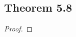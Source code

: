 \documentclass[../../main.tex]{subfiles}
\begin{document}
\subsection{Theorem 5.8}
\begin{wts}

\end{wts}
\begin{proof}

\end{proof}
\end{document}
